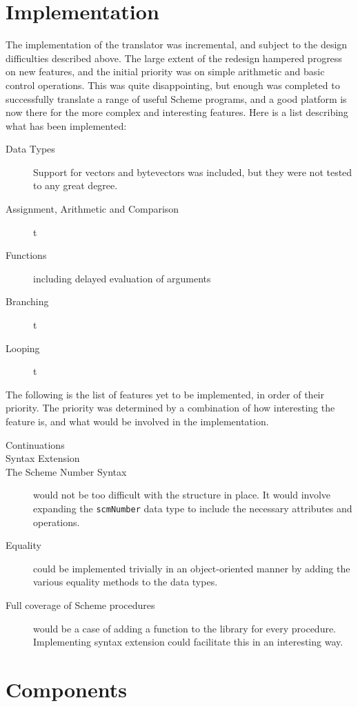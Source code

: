 \section{Implementation}

The implementation of the translator was incremental, and subject to the design
difficulties described above. The large extent of the redesign hampered progress
on new features, and the initial priority was on simple arithmetic and basic
control operations. This was quite disappointing, but enough was completed to
successfully translate a range of useful Scheme programs, and a good platform is
now there for the more complex and interesting features. Here is a list describing what has been implemented:

\begin{description}
\item[Data Types] Support for vectors and bytevectors was included, but they
were not tested to any great degree.
\item[Assignment, Arithmetic and Comparison] t
\item[Functions] including delayed evaluation of arguments
\item[Branching] t
\item[Looping] t
\end{description}

The following is the list of features yet to be implemented, in order of their
priority. The priority was determined by a combination of how interesting the
feature is, and what would be involved in the implementation.
\begin{description}
\item[Continuations] 
\item[Syntax Extension] 
\item[The Scheme Number Syntax] would not be too difficult with the
structure in place. It would involve expanding the \texttt{scmNumber} data type
to include the necessary attributes and operations.
\item[Equality] could be implemented trivially in an object-oriented manner
by adding the various equality methods to the data types.
\item[Full coverage of Scheme procedures] would be a case of adding a function
to the library for every procedure. Implementing syntax extension could
facilitate this in an interesting way.
\end{description}


\section{Components}

